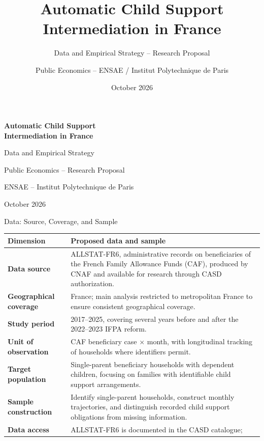 \documentclass[aspectratio=169,10pt]{beamer}
\title{Automatic Child Support Intermediation in France}
\subtitle{Data and Empirical Strategy -- Research Proposal}
\author{Public Economics -- ENSAE / Institut Polytechnique de Paris}
\date{October 2026}
\begin{document}
\begin{frame}[plain]
\vspace{1.2cm}{\color{ensae}\rule{1.6cm}{2pt}}\par\vspace{0.5cm}
{\LARGE\color{ensae}\bfseries Automatic Child Support\\[0.1cm] Intermediation in France}\par\vspace{0.45cm}
{\large Data and Empirical Strategy}\par\vspace{0.6cm}
Public Economics -- Research Proposal\par\vspace{0.15cm}
ENSAE -- Institut Polytechnique de Paris\par\vspace{0.25cm}
{\small October 2026}
\end{frame}




\begin{frame}{Data: Source, Coverage, and Sample}

\small
\renewcommand{\arraystretch}{1.35}

\begin{tabularx}{\textwidth}{
    >{\bfseries}p{3.0cm} X
}
\toprule
Dimension & Proposed data and sample \\
\midrule

Data source &
ALLSTAT-FR6, administrative records on beneficiaries
of the French Family Allowance Funds (CAF),
produced by CNAF and available for research
through CASD authorization. \\

Geographical coverage &
France; main analysis restricted to metropolitan
France to ensure consistent geographical coverage. \\

Study period &
2017--2025, covering several years before and
after the 2022--2023 IFPA reform. \\

Unit of observation &
CAF beneficiary case $\times$ month,
with longitudinal tracking of households
where identifiers permit. \\

Target population &
Single-parent beneficiary households with
dependent children, focusing on families
with identifiable child support arrangements. \\

Sample construction &
Identify single-parent households, construct
monthly trajectories, and distinguish recorded
child support obligations from missing information. \\

Data access &
ALLSTAT-FR6 is documented in the CASD catalogue;\\

\bottomrule
\end{tabularx}

\end{frame}
\end{document}
